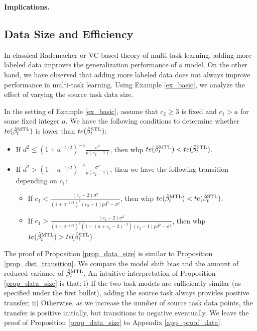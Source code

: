 \textbf{Implications.} 

\subsection{Data Size and Efficiency}\label{sec_data}

In classical Rademacher or VC based theory of multi-task learning, adding more labeled data improves the generalization performance of a model.
On the other hand, we have observed that adding more labeled data does not always improve performance in multi-task learning.
Using Example \ref{ex_basic}, we analyze the effect of varying the source task data size.

\begin{proposition}\label{prop_data_size}
	In the setting of Example \ref{ex_basic}, assume that $c_2  \ge 3$ is fixed and $c_1 > a$ for some fixed integer $a$.	We have the following conditions to determine whether $te(\hat{\beta}_t^{\text{MTL}})$ is lower than $te(\hat{\beta}_t^{\text{STL}})$:
	\begin{itemize}
\item If $d^2 \le (1 + a^{-1/2})^{-4}\frac{\sigma^2}{p(c_2-1)}$, then whp $te(\hat{\beta}_t^{\text{MTL}}) < te(\hat{\beta}_t^{\text{STL}})$. 
		 
\item If $d^2 > (1 - a^{-1/2})^{-4}\frac{\sigma^2}{p (c_2 - 1)}$, then we have the following transition depending on $c_1$:
		\begin{itemize}
			\item If $c_1 < \frac{(c_2-2)\sigma^2}{(1+a^{-1/2})^4(c_2 - 1) pd^2 - \sigma^2}$, then whp $te(\hat{\beta}_t^{\text{MTL}}) < te(\hat{\beta}_t^{\text{STL}})$.
			\item If $c_1 > \frac{(c_2-2) \sigma^2}{(1-a^{-1/2})^4(1-(a+c_2-2)^{-2})(c_2 - 1) pd^2 - \sigma^2}$, then whp $te(\hat{\beta}_t^{\text{MTL}}) > te(\hat{\beta}_t^{\text{STL}})$.
		\end{itemize}
	\end{itemize}
\end{proposition}

The proof of Proposition \ref{prop_data_size} is similar to Proposition \ref{prop_dist_transition}.
We compare the model shift bias and the amount of reduced variance of $\hat{\beta}_t^{\text{MTL}}$.
An intuitive interpretation of Proposition \ref{prop_data_size} is that:
i) If the two task models are sufficiently similar (as specified under the first bullet), adding the source task always provides positive transfer;
ii) Otherwise, as we increase the number of source task data points, the transfer is positive initially, but transitions to negative eventually.
We leave the proof of Proposition \ref{prop_data_size} to Appendix \ref{app_proof_data}.

